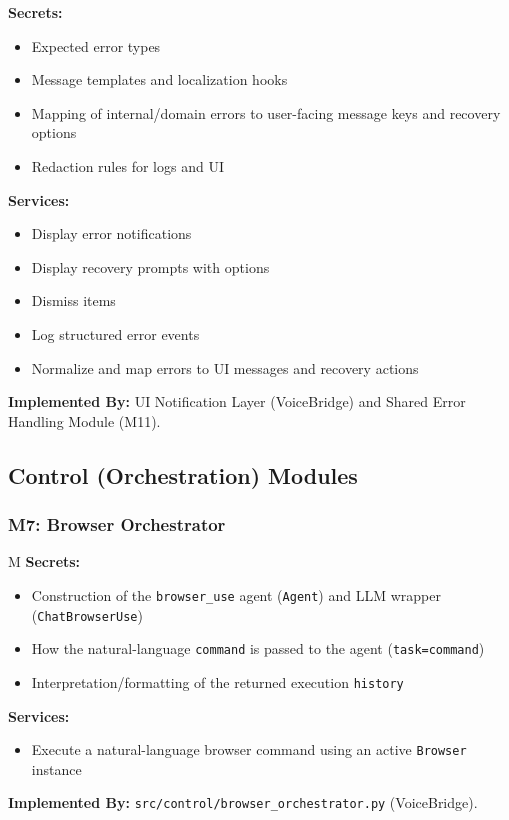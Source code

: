 \documentclass[12pt, titlepage]{article}
\newcounter{mnum}
\newcommand{\mthemnum}{M\themnum}
\begin{document}
\textbf{Secrets:} 
\begin{itemize}
  \item Expected error types
  \item Message templates and localization hooks
  \item Mapping of internal/domain errors to user-facing message keys and recovery options
  \item Redaction rules for logs and UI
\end{itemize}
\textbf{Services:} 
\begin{itemize}
  \item Display error notifications
  \item Display recovery prompts with options
  \item Dismiss items
  \item Log structured error events
  \item Normalize and map errors to UI messages and recovery actions
\end{itemize}
\textbf{Implemented By:} UI Notification Layer (VoiceBridge) and Shared Error Handling Module (M11).

\subsection*{Control (Orchestration) Modules}

\subsubsection*{M7: Browser Orchestrator} \mthemnum\label{m7}
\textbf{Secrets:}
\begin{itemize}
  \item Construction of the \texttt{browser\_use} agent (\texttt{Agent}) and LLM wrapper (\texttt{ChatBrowserUse})
  \item How the natural-language \texttt{command} is passed to the agent (\texttt{task=command})
  \item Interpretation/formatting of the returned execution \texttt{history}
\end{itemize}
\textbf{Services:}
\begin{itemize}
  \item Execute a natural-language browser command using an active \texttt{Browser} instance
\end{itemize}
\textbf{Implemented By:} \texttt{src/control/browser\_orchestrator.py} (VoiceBridge).
\end{document}
